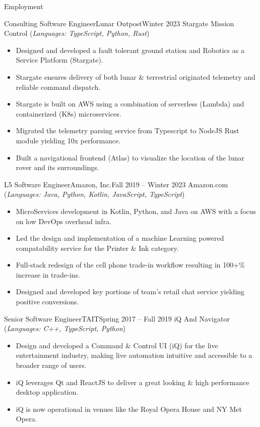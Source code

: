 \documentclass[]{mussocv}
\begin{document}
	\makeheader
	
	\begin{cvsection}{Employment}
		\begin{cvsubsection}{Consulting Software Engineer}{Lunar Outpost}{Winter 2023}
			Stargate Mission Control (\textit{Languages: TypeScript, Python, Rust})			
			\begin{itemize}
				\item Designed and developed a fault tolerant ground station and Robotics as a Service Platform (Stargate).
				\item Stargate ensures delivery of both lunar \& terrestrial originated telemetry and reliable command dispatch.
				\item Stargate is built on AWS using a combination of serverless (Lambda) and containerized (K8s) microservices.
				\item Migrated the telemetry parsing service from Typescript to NodeJS Rust module yielding 10x performance.
				\item Built a navigational frontend (Atlas) to visualize the location of the lunar rover and its surroundings.
			\end{itemize}
		\end{cvsubsection}
		
		\begin{cvsubsection}{L5 Software Engineer}{Amazon, Inc.}{Fall 2019 -- Winter 2023}
			Amazon.com (\textit{Languages: Java, Python, Kotlin, JavaScript, TypeScript})
			\begin{itemize}
				\item MicroServices development in Kotlin, Python, and Java on AWS with a focus on low DevOps overhead infra.
				\item Led the design and implementation of a machine Learning powered compatability service for the Printer \& Ink category.
				\item Full-stack redesign of the cell phone trade-in workflow resulting in 100+\% increase in trade-ins.
				\item Designed and developed key portions of team's retail chat service yielding positive conversions.
			\end{itemize}
		\end{cvsubsection}
		
		\begin{cvsubsection}{Senior Software Engineer}{TAIT}{Spring 2017 -- Fall 2019}
			iQ And Navigator (\textit{Languages: C++, TypeScript, Python})
			\begin{itemize}
				\item Design and developed a Command \& Control UI (iQ) for the live entertainment industry, making live automation intuitive and accessible to a broader range of users.
				\item iQ leverages Qt and ReactJS to deliver a great looking \& high performance desktop application.
				\item iQ is now operational in venues like the Royal Opera House and NY Met Opera.
			\end{itemize}
		\end{cvsubsection}
		

\end{cvsection}
\end{document}
